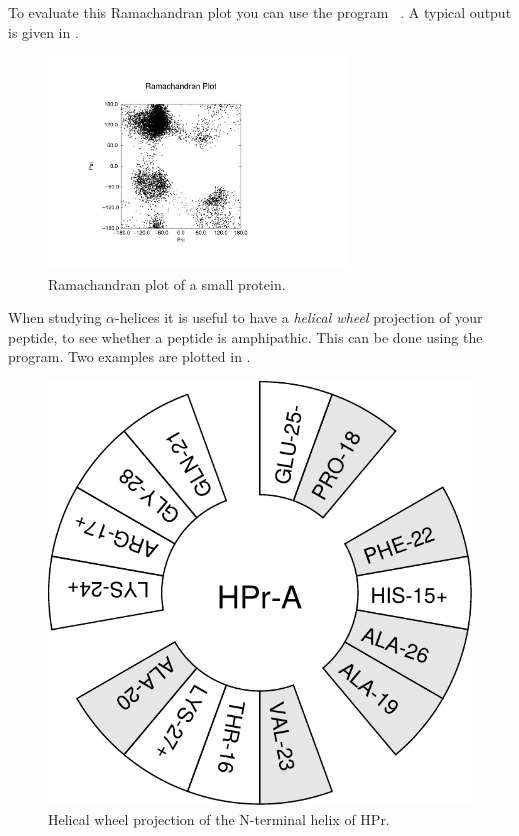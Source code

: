 To evaluate this Ramachandran plot you can use the program {\tt
{}}.
A typical output is given in .

\begin{figure}
\centerline{
{\includegraphics[width=8cm]{plots/rama}}}
\caption{Ramachandran plot of a small protein.}
\label{fig:rama}
\end{figure}

When studying $\alpha$-helices 
it is useful to have a {\em helical wheel} projection
of your peptide, to see whether a peptide is amphipathic. This can be done
using the {\tt {}} program. Two examples are
plotted in .

\begin{figure}
\centerline{\includegraphics[width=\htw]{plots/hpr-wheel}}
\caption{Helical wheel projection of the N-terminal helix of HPr.}
\label{fig:wheel}
\end{figure}

